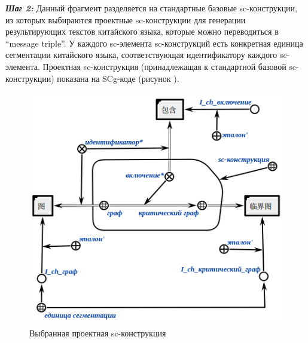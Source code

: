 \textbf{\textit{Шаг 2:}} Данный фрагмент разделяется на стандартные базовые sc-конструкции, из которых выбираются проектные sc-конструкции для генерации результирующих текстов китайского языка, которые можно переводиться в ``message triple''. У каждого sc-элемента sc-конструкций есть конкретная единица сегментации китайского языка, соответствующая идентификатору каждого sc-элемента. Проектная sc-конструкция (принадлежащая к стандартной базовой sc-конструкции) показана на SCg-коде (рисунок \textit{}).
\begin{figure}[H]
	\centering
	\includegraphics[scale=0.8]{images/part4/chapter_chinese/candidate_sc_structure.png}
	\caption{Выбранная проектная sc-конструкция}
	\label{fig:candidate-sc-construction}
\end{figure}

